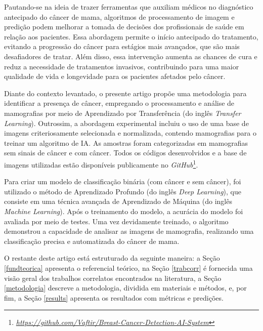 Pautando-se na ideia de trazer ferramentas que auxiliam médicos no diagnóstico antecipado do câncer de mama, algoritmos de processamento de imagem e predição podem melhorar a tomada de decisões dos profissionais de saúde em relação aos pacientes. Essa abordagem permite o início antecipado do tratamento, evitando a progressão do câncer para estágios mais avançados, que são mais desafiadores de tratar. Além disso, essa intervenção aumenta as chances de cura e reduz a necessidade de tratamentos invasivos, contribuindo para uma maior qualidade de vida e longevidade para os pacientes afetados pelo câncer.

Diante do contexto levantado, o presente artigo propõe uma metodologia para identificar a presença de câncer, empregando o processamento e análise de mamografias por meio de Aprendizado por Transferência (do inglês \textit{Transfer Learning}). Outrossim, a abordagem experimental incluiu o uso de uma base de imagens criteriosamente selecionada e normalizada, contendo mamografias para o treinar um algoritmo de IA. As amostras foram categorizadas em mamografias sem sinais de câncer e com câncer. Todos os códigos desenvolvidos e a base de imagens utilizadas estão disponíveis publicamente no \textit{GitHub}\footnote{\href{https://github.com/Vaftir/Breast-Cancer-Detection-AI-System}{\textit{https://github.com/Vaftir/Breast-Cancer-Detection-AI-System}}}.

Para criar um modelo de classificação binária (com câncer e sem câncer), foi utilizado o método de Aprendizado Profundo (do inglês \textit{Deep Learning}), que consiste em uma técnica avançada de Aprendizado de Máquina (do inglês \textit{Machine Learning}). Após o treinamento do modelo, a acurácia do modelo foi avaliada por meio de testes. Uma vez devidamente treinado, o algoritmo demonstrou a capacidade de analisar as imagens de mamografia, realizando uma classificação precisa e automatizada do câncer de mama.

O restante deste artigo está estruturado da seguinte maneira: a Seção \ref{fundteorica} apresenta o referencial teórico, na Seção \ref{trabcorr} é fornecida uma visão geral dos trabalhos correlatos encontrados na literatura, a Seção \ref{metodologia} descreve a metodologia, dividida em materiais e métodos, e, por fim, a Seção \ref{results} apresenta os resultados com métricas e predições. 




